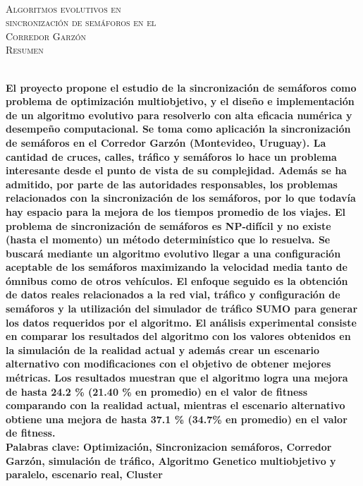 {
\thispagestyle{empty}
~\\[0.2cm]
\begin{center}
    \textsc{\huge Algoritmos evolutivos en  } \\[0.2cm] 
    \textsc{\huge sincronización de semáforos en el  } \\[0.2cm]         
    \textsc{\huge Corredor Garzón} \\[1cm]
    \textsc{\Large Resumen}
\end{center}
~\\[0.2cm]
\textbf{\large 
El proyecto propone el estudio de la sincronización de semáforos como problema de optimización multiobjetivo, y el diseño e implementación de un algoritmo evolutivo para resolverlo con alta eficacia numérica y desempeño computacional. \newline \newline
Se toma como aplicación la sincronización de semáforos en el Corredor Garzón  (Montevideo, Uruguay). La cantidad de cruces, calles, tráfico y semáforos lo hace un problema interesante desde el punto de vista de su complejidad. Además se ha admitido, por parte de las autoridades responsables, los problemas relacionados con la sincronización de los semáforos, por lo que todavía hay espacio para la mejora de los tiempos promedio de los viajes.  \newline \newline
El problema de sincronización de semáforos es NP-difícil y no existe (hasta el momento) un método determinístico que lo resuelva. Se buscará mediante un algoritmo evolutivo llegar a una configuración aceptable de los semáforos maximizando la velocidad media tanto de ómnibus como de otros vehículos.
El enfoque seguido es la obtención de datos reales relacionados a la red vial, tráfico y configuración de semáforos y la utilización del simulador de tráfico SUMO para generar los datos requeridos por el algoritmo.
\newline \newline
El análisis experimental consiste en comparar los resultados del algoritmo con los valores obtenidos en la simulación de la realidad actual y además crear un escenario alternativo con modificaciones con el objetivo de obtener mejores métricas. Los resultados muestran que el algoritmo logra una mejora de hasta  24.2 \% (21.40 \% en promedio) en el valor de fitness comparando con la realidad actual, mientras el escenario alternativo obtiene una mejora de hasta 37.1 \% (34.7\% en promedio) en el valor de fitness.
 } 	
	~\\[1.0cm]
    \textbf{\large Palabras clave: Optimización, Sincronizacion semáforos, Corredor Garzón, simulación de tráfico,  Algoritmo Genetico multiobjetivo y paralelo,  escenario real, Cluster}

}
\cleardoublepage
